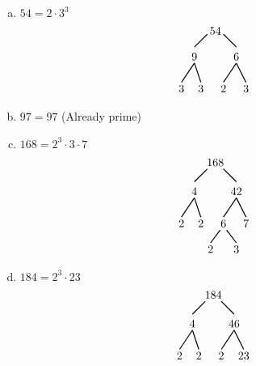 \documentclass[11pt,letterpaper]{article}
\begin{document}
\sol
\begin{enumerate}[(a)]
\item $54= 2 \cdot 3^3$
	\[
	\begin{tikzpicture}
	\node at (-0.15,0) {$54$};
	\draw[line width=0.03cm] (-0.4,-0.1) -- (-0.8,-0.5);
	\node at (-0.8,-0.8) {$9$};
	\draw[line width=0.03cm]  (0.1,-0.1) -- (0.5,-0.5);
	\node at (0.5,-0.8) {$6$};
		
	\draw[line width=0.03cm] (-0.8,-1) -- (-1.2,-1.6);
	\node at (-1.2,-1.8) {$3$};
	\draw[line width=0.03cm] (-0.8,-1) -- (-0.6,-1.6);
	\node at (-0.6,-1.8) {$3$};
	
	\draw[line width=0.03cm] (0.5,-1) -- (0.1,-1.6);
	\node at (0.1,-1.8) {$2$};
	\draw[line width=0.03cm] (0.5,-1) -- (0.8,-1.6);
	\node at (0.8,-1.8) {$3$};
	\end{tikzpicture}
	\] \pspace
	
\item $97= 97$ (Already prime) \pspace

\item $168= 2^3 \cdot 3 \cdot 7$
	\[
	\begin{tikzpicture}
	\node at (-0.15,0.1) {$168$};
	\draw[line width=0.03cm] (-0.4,-0.1) -- (-0.8,-0.5);
	\node at (-0.8,-0.8) {$4$};
	\draw[line width=0.03cm]  (0.1,-0.1) -- (0.5,-0.5);
	\node at (0.5,-0.8) {$42$};
		
	\draw[line width=0.03cm] (-0.8,-1) -- (-1.2,-1.6);
	\node at (-1.2,-1.8) {$2$};
	\draw[line width=0.03cm] (-0.8,-1) -- (-0.6,-1.6);
	\node at (-0.6,-1.8) {$2$};
	
	\draw[line width=0.03cm] (0.5,-1) -- (0.1,-1.6);
	\node at (0.1,-1.8) {$6$};
	\draw[line width=0.03cm] (0.5,-1) -- (0.8,-1.6);
	\node at (0.8,-1.8) {$7$};
	
	\draw[line width=0.03cm] (0,-2.0) -- (-0.3,-2.4);
	\node at (-0.3,-2.6) {$2$};
	\draw[line width=0.03cm] (0.2,-2.0) -- (0.5,-2.4);
	\node at (0.5,-2.6) {$3$};
	\end{tikzpicture}
	\] \pspace

\item $184= 2^3 \cdot 23$
	\[
	\begin{tikzpicture}
	\node at (-0.15,0.1) {$184$};
	\draw[line width=0.03cm] (-0.4,-0.1) -- (-0.8,-0.5);
	\node at (-0.8,-0.8) {$4$};
	\draw[line width=0.03cm]  (0.1,-0.1) -- (0.5,-0.5);
	\node at (0.5,-0.8) {$46$};
		
	\draw[line width=0.03cm] (-0.8,-1) -- (-1.2,-1.6);
	\node at (-1.2,-1.8) {$2$};
	\draw[line width=0.03cm] (-0.8,-1) -- (-0.6,-1.6);
	\node at (-0.6,-1.8) {$2$};
	
	\draw[line width=0.03cm] (0.5,-1) -- (0.1,-1.6);
	\node at (0.1,-1.8) {$2$};
	\draw[line width=0.03cm] (0.5,-1) -- (0.8,-1.6);
	\node at (0.8,-1.8) {$23$};
	\end{tikzpicture}
	\] 
\end{enumerate}
\end{document}
